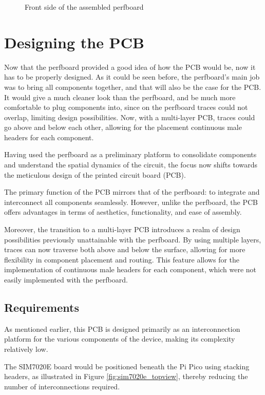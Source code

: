 \begin{figure}[h]
\begin{minipage}[b]{0.45\textwidth}
        \caption{Front side of the assembled perfboard}
        \label{fig:perfboard_assembled_front}
    \end{minipage}
\end{figure}


\section{Designing the PCB}

Now that the perfboard provided a good idea of how the PCB would be, now it has to be properly designed. 
As it could be seen before, the perfboard's main job was to bring all components together, and that will 
also be the case for the PCB. It would give a much cleaner look than the perfboard, and be much more 
comfortable to plug components into, since on the perfboard traces could not overlap, limiting design 
possibilities. Now, with a multi-layer PCB, traces could go above and below each other, allowing for the 
placement continuous male headers for each component.

Having used the perfboard as a preliminary platform to consolidate components and understand the spatial 
dynamics of the circuit, the focus now shifts towards the meticulous design of the printed circuit board 
(PCB).

The primary function of the PCB mirrors that of the perfboard: to integrate and interconnect all 
components seamlessly. However, unlike the perfboard, the PCB offers advantages in terms of aesthetics, 
functionality, and ease of assembly.

Moreover, the transition to a multi-layer PCB introduces a realm of design possibilities previously 
unattainable with the perfboard. By using multiple layers, traces can now traverse both above and below 
the surface, allowing for more flexibility in component placement and routing. This feature allows for 
the implementation of continuous male headers for each component, which were not easily implemented with 
the perfboard.


\subsection{Requirements}

As mentioned earlier, this PCB is designed primarily as an interconnection platform for the various 
components of the device, making its complexity relatively low.

The SIM7020E board would be positioned beneath the Pi Pico using stacking headers, as illustrated in 
Figure \ref{fig:sim7020e_topview}, thereby reducing the number of interconnections required. 

